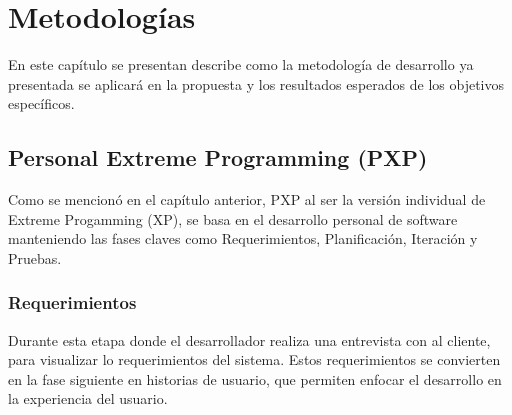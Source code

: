 ﻿\documentclass{iccmemoria}
\begin{document}
\chapter{Metodologías}
En este capítulo se presentan describe como la metodología de desarrollo ya presentada se aplicará en la propuesta y los resultados esperados de los objetivos específicos. 
\begingroup
\section{Personal Extreme Programming (PXP)}
Como se mencionó en el capítulo anterior, PXP al ser la versión individual de Extreme Progamming (XP), se basa en el desarrollo personal de software manteniendo las fases claves como Requerimientos, Planificación, Iteración y Pruebas. 

\subsection{Requerimientos}
Durante esta etapa donde el desarrollador realiza una entrevista con al cliente, para visualizar lo requerimientos del sistema. Estos requerimientos se convierten en la fase siguiente en historias de usuario, que permiten enfocar el desarrollo en la experiencia del usuario.
\end{document}
